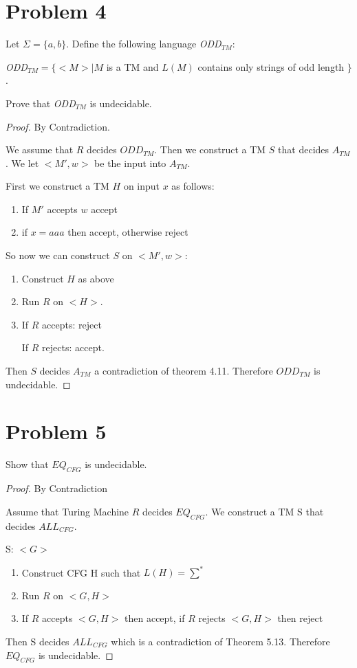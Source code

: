 \documentclass[11pt]{article}
\begin{document}
\newpage
\section*{Problem 4}

Let $\Sigma=\{a,b\}$. Define the following language {\em ODD}$_{TM}$:

{\em ODD}$_{TM}=\{ <M>|M$ is a TM and $L(M)$ contains only strings of odd length $\}$.

Prove that {\em ODD}$_{TM}$ is undecidable.



\begin{proof} By Contradiction.

We assume that $R$ decides $ODD_{TM}$. Then we construct a TM $S$ that decides $A_{TM}$. We let $<M', w>$ be the input into $A_{TM}$. 

First we construct a TM $H$ on input $x$ as follows:
\begin{enumerate}
	\item If $M'$ accepts $w$ accept
	\item if $x = aaa$ then accept, otherwise reject
\end{enumerate}

So now we can construct $S$ on $<M', w>$:
\begin{enumerate}
	\item Construct $H$ as above
	\item Run $R$ on $<H>$.
	\item If $R$ accepts: reject
	
	If $R$ rejects: accept.
\end{enumerate}

Then $S$ decides $A_{TM}$ a contradiction of theorem 4.11. Therefore $ODD_{TM}$ is undecidable.
\end{proof}


\newpage
\section*{Problem 5}

Show that $EQ_{CFG}$ is undecidable.
\newline

\begin{proof} By Contradiction

Assume that Turing Machine $R$ decides $EQ_{CFG}$. We construct a TM S that decides $ALL_{CFG}$.

S: $<G>$
\begin{enumerate}[1.]
	\item Construct CFG H such that $L(H) = \sum^*$
	\item Run $R$ on $<G, H>$
	\item If $R$ accepts $<G, H>$ then accept, if $R$ rejects $<G,H>$ then reject
\end{enumerate}

Then S decides $ALL_{CFG}$ which is a contradiction of Theorem 5.13. Therefore $EQ_{CFG}$ is undecidable. 

\end{proof}
\end{document}

